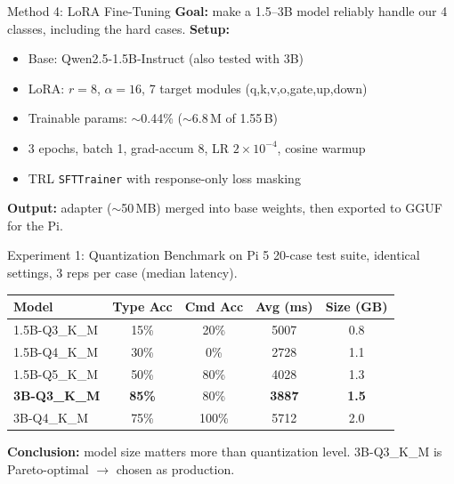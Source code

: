 \documentclass[aspectratio=169]{beamer}
\begin{document}
\begin{frame}{Method 4: LoRA Fine-Tuning}
\textbf{Goal:} make a 1.5--3B model reliably handle our 4 classes, including the hard cases.
\vspace{0.4em}
\textbf{Setup:}
\begin{itemize}
\item Base: Qwen2.5-1.5B-Instruct (also tested with 3B)
\item LoRA: $r{=}8$, $\alpha{=}16$, 7 target modules (q,k,v,o,gate,up,down)
\item Trainable params: $\sim$0.44\% ($\sim$6.8\,M of 1.55\,B)
\item 3 epochs, batch 1, grad-accum 8, LR $2{\times}10^{-4}$, cosine warmup
\item TRL \texttt{SFTTrainer} with response-only loss masking
\end{itemize}
\vspace{0.4em}
\textbf{Output:} adapter ($\sim$50\,MB) merged into base weights, then exported to GGUF for the Pi.
\end{frame}

\begin{frame}{Experiment 1: Quantization Benchmark on Pi 5}
20-case test suite, identical settings, 3 reps per case (median latency).
\begin{table}[h]
\centering
\small
\begin{tabular}{lcccc}
\toprule
\textbf{Model} & \textbf{Type Acc} & \textbf{Cmd Acc} & \textbf{Avg (ms)} & \textbf{Size (GB)} \\
\midrule
1.5B-Q3\_K\_M & 15\% & 20\% & 5007 & 0.8 \\
1.5B-Q4\_K\_M & 30\% & 0\% & 2728 & 1.1 \\
1.5B-Q5\_K\_M & 50\% & 80\% & 4028 & 1.3 \\
\textbf{3B-Q3\_K\_M} & \textbf{85\%} & 80\% & \textbf{3887} & \textbf{1.5} \\
3B-Q4\_K\_M & 75\% & 100\% & 5712 & 2.0 \\
\bottomrule
\end{tabular}
\end{table}
\vspace{0.4em}
\textbf{Conclusion:} model size matters more than quantization level. 3B-Q3\_K\_M is Pareto-optimal $\rightarrow$ chosen as production.
\end{frame}
\end{document}
